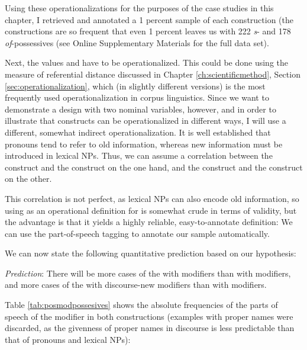Using these operationalizations for the purposes of the case studies in this chapter, I retrieved and annotated a 1 percent sample of each construction (the constructions are so frequent that even 1 percent leaves us with 222 \textit{s}- and 178 \textit{of}-possessives (see Online Supplementary Materials for the full data set).

Next, the values  and  have to be operationalized. This could be done using the measure of referential distance discussed in Chapter \ref{ch:scientificmethod}, Section \ref{sec:operationalization}, which (in slightly different versions) is the most frequently used operationalization in corpus linguistics. Since we want to demonstrate a design with two nominal variables, however, and in order to illustrate that constructs can be operationalized in different ways, I will use a different, somewhat indirect operationalization. It is well established that pronouns tend to refer to old information, whereas new information must be introduced in lexical NPs. Thus, we can assume a correlation between the construct  and the construct  on the one hand, and the construct  and the construct  on the other.

This correlation is not perfect, as lexical NPs can also encode old information, so using  as an operational definition for  is somewhat crude in terms of validity, but the advantage is that it yields a highly reliable, easy-to-annotate definition: We can use the part-of-speech tagging to annotate our sample automatically.

We can now state the following quantitative prediction based on our hypothesis:

\begin{exe}
\ex \emph{Prediction}: There will be more cases of the  with  modifiers than with  modifiers, and more cases of the  with discourse-new modifiers than with  modifiers.
\label{ex:givennessprediction}
\end{exe}

Table \ref{tab:posmodpossesives} shows the absolute frequencies of the parts of speech of the modifier in both constructions (examples with proper names were discarded, as the givenness of proper names in discourse is less predictable than that of pronouns and lexical NPs):


